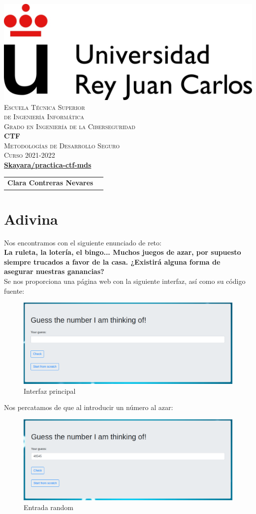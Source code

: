 \documentclass[12pt, a4paper,twoside,titlepage]{article}
\newcommand{\grado}{Grado en Ingeniería de la Ciberseguridad}
\newcommand{\pregunta} {CTF}
\newcommand{\asignatura}{Metodologías de Desarrollo Seguro}
\newcommand{\curso}{Curso 2021-2022}
\newcommand{\githubCI}{\href{https://github.com/Skayara/practica-ctf-mds}{Skayara/practica-ctf-mds}}
\newcommand{\autorA}{Clara Contreras Nevares}
\renewcommand*{\maketitle}{%
\begin{titlepage}
  \pagestyle{plain}

  \begin{center}
    \vspace*{-4em}
    \includegraphics[scale=.3]{Figuras/urjc.jpg}\\
    \vspace*{2em}
    \textsc{\LARGE Escuela Técnica Superior\\de Ingeniería Informática}\\
    \vspace*{2em}
    \textsc{\Large \grado}\\  
    \vspace*{\fill}
    \textbf{\LARGE \pregunta\\}  
    \vspace*{2em}
    \textsc{\large \asignatura\\}
    \vspace*{.5em}
    \textsc{\large \curso\\}  
    \vspace*{4em}\vspace*{\fill}
    \textbf{\large \githubCI\\} 
    \vspace*{4em}\vspace*{\fill}
    {%
      \large
      \begin{tabular}{rl}
        \textbf{\autorA}\\
      \end{tabular}
    }
  \end{center}
  
\end{titlepage}
}
\begin{document}
\maketitle

\thispagestyle{plain}

\section{Adivina}

Nos encontramos con el siguiente enunciado de reto:\\

\textbf{La ruleta, la lotería, el bingo... Muchos juegos de azar, por supuesto siempre trucados a favor de la casa. ¿Existirá alguna forma de asegurar nuestras ganancias?}\\

Se nos proporciona una página web con la siguiente interfaz, así como su código fuente:\\

\begin{figure}[H]
    \centering
    \includegraphics[width=1\linewidth]{Figuras/Adivina/1.png}
    \caption{Interfaz principal}
    \label{fig:adivina}
\end{figure}

Nos percatamos de que al introducir un número al azar:

\begin{figure}[H]
    \centering
    \includegraphics[width=1\linewidth]{Figuras/Adivina/2.png}
    \caption{Entrada random}
    \label{fig:adivina}
\end{figure}
\end{document}
